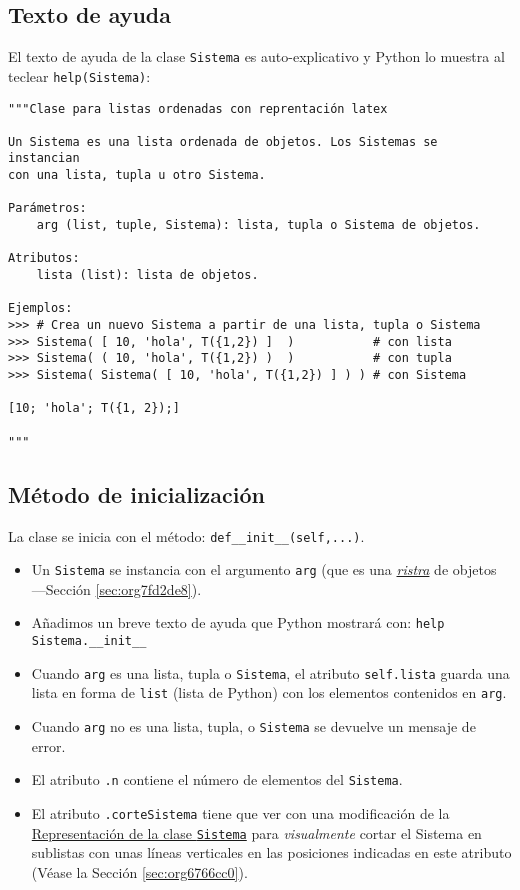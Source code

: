 \documentclass[11pt]{report}
\begin{document}
\subsection{Texto de ayuda}
\label{sec:org6608670}

El texto de ayuda de la clase \texttt{Sistema} es auto-explicativo y Python
lo muestra al teclear \texttt{help(Sistema)}:

\begin{verbatim}
"""Clase para listas ordenadas con reprentación latex

Un Sistema es una lista ordenada de objetos. Los Sistemas se instancian
con una lista, tupla u otro Sistema. 

Parámetros:
    arg (list, tuple, Sistema): lista, tupla o Sistema de objetos.

Atributos:
    lista (list): lista de objetos.

Ejemplos:
>>> # Crea un nuevo Sistema a partir de una lista, tupla o Sistema
>>> Sistema( [ 10, 'hola', T({1,2}) ]  )           # con lista
>>> Sistema( ( 10, 'hola', T({1,2}) )  )           # con tupla
>>> Sistema( Sistema( [ 10, 'hola', T({1,2}) ] ) ) # con Sistema

[10; 'hola'; T({1, 2});]

"""
\end{verbatim}

\subsection{Método de inicialización}
\label{sec:orgda241ae}

La clase se inicia con el método: \texttt{def\_\_init\_\_(self,...)}.

\begin{itemize}
\item Un \texttt{Sistema} se instancia con el argumento \texttt{arg} (que es una
\hyperref[sec:org7fd2de8]{\emph{ristra}} de objetos ---Sección \ref{sec:org7fd2de8}).

\item Añadimos un breve texto de ayuda que Python mostrará con: \texttt{help Sistema.\_\_init\_\_}

\item Cuando \texttt{arg} es una lista, tupla o \texttt{Sistema}, el atributo \texttt{self.lista}
guarda una lista en forma de \texttt{list} (lista de Python) con los
elementos contenidos en \texttt{arg}.

\item Cuando \texttt{arg} no es una lista, tupla, o \texttt{Sistema} se devuelve un
mensaje de error.

\item El atributo \texttt{.n} contiene el número de elementos del \texttt{Sistema}.

\item El atributo \texttt{.corteSistema} tiene que ver con una modificación
de la \hyperref[sec:org6766cc0]{Representación de la clase \texttt{Sistema}} para \emph{visualmente} cortar
el Sistema en sublistas con unas líneas verticales en las posiciones
indicadas en este atributo (Véase la Sección \ref{sec:org6766cc0}).
\end{itemize}
\end{document}
